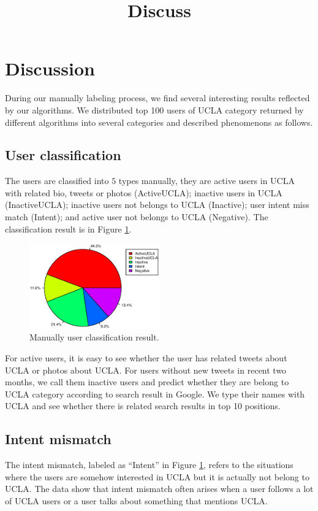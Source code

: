 \documentclass{article}
\begin{document}
\title{Discuss}
\maketitle \else \fi

\section{Discussion}\label{sec:discussion}
During our manually labeling process, we find several interesting results reflected by our algorithms. We distributed top 100 users of UCLA category returned by different algorithms into several categories and described phenomenons as follows.

\subsection{User classification}
The users are classified into $5$ types manually, they are active users in UCLA with related bio, tweets or photos (ActiveUCLA); inactive users in UCLA (InactiveUCLA); inactive users not belongs to UCLA (Inactive); user intent miss match (Intent); and active user not belongs to UCLA (Negative). The classification result is in Figure \ref{fig:userclass}.

\begin{figure}[h]
\centering
\includegraphics[width=0.5\textwidth]{experiment/uc.eps}
\caption{Manually user classification result.}
\label{fig:userclass}
\end{figure}

For active users, it is easy to see whether the user has related tweets about UCLA or photos about UCLA. For users without new tweets in recent two months, we call them inactive users and predict whether they are belong to UCLA category according to search result in Google. We type their names with UCLA and see whether there is related search results in top 10 positions.

\subsection{Intent mismatch}
The intent mismatch, labeled as ``Intent'' in Figure \ref{fig:userclass}, refers to the situations where the users are somehow interested in UCLA but it is actually not belong to UCLA. The data show that intent mismatch often arises when a user follows a lot of UCLA users or a user talks about something that mentions UCLA.
\end{document}
